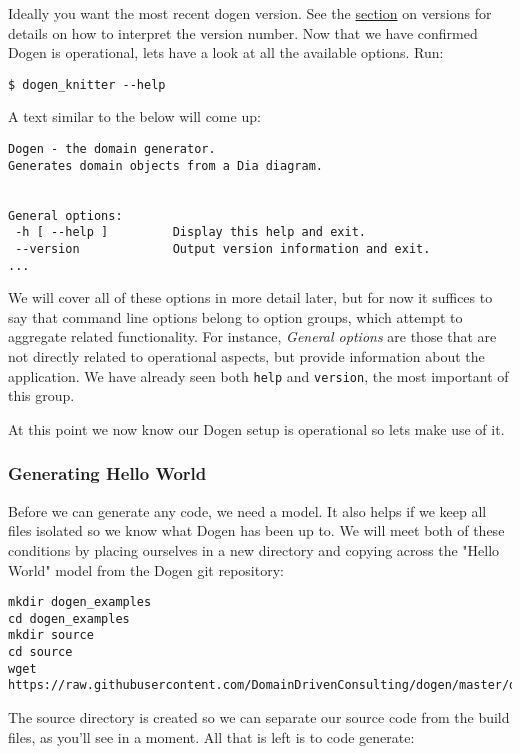 \documentclass[11pt]{article}
\begin{document}
Ideally you want the most recent dogen version. See the \href{https://github.com/DomainDrivenConsulting/dogen/blob/master/doc/manual/manual.org#versions-and-build-numbers}{section} on
versions for details on how to interpret the version number. Now that
we have confirmed Dogen is operational, lets have a look at all the
available options. Run:

\begin{verbatim}
$ dogen_knitter --help
\end{verbatim}

A text similar to the below will come up:

\begin{verbatim}
Dogen - the domain generator.
Generates domain objects from a Dia diagram.


General options:
 -h [ --help ]         Display this help and exit.
 --version             Output version information and exit.
...
\end{verbatim}

We will cover all of these options in more detail later, but for now
it suffices to say that command line options belong to option groups,
which attempt to aggregate related functionality. For instance,
\emph{General options} are those that are not directly related to
operational aspects, but provide information about the application. We
have already seen both \texttt{help} and \texttt{version}, the most important of
this group.

At this point we now know our Dogen setup is operational so lets make
use of it.

\subsubsection{Generating Hello World}
\label{sec-3-2-2}

Before we can generate any code, we need a model. It also helps if we
keep all files isolated so we know what Dogen has been up to. We will
meet both of these conditions by placing ourselves in a new directory
and copying across the "Hello World" model from the Dogen git
repository:

\begin{verbatim}
mkdir dogen_examples
cd dogen_examples
mkdir source
cd source
wget https://raw.githubusercontent.com/DomainDrivenConsulting/dogen/master/diagrams/hello_world.dia
\end{verbatim}

The source directory is created so we can separate our source code
from the build files, as you'll see in a moment. All that is left is
to code generate:
\end{document}
